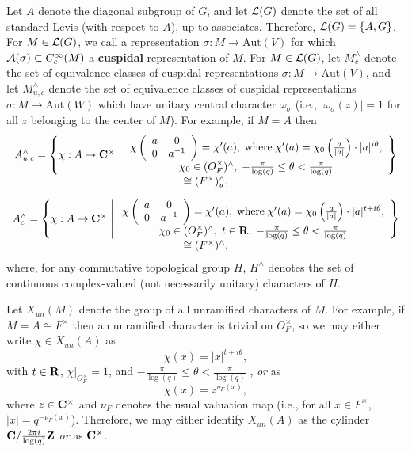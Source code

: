 \documentclass[11pt, a4paper]{article}
\begin{document}
Let $A$ denote the diagonal subgroup of $G$, and let ${\cal L}(G)$ denote
the set of all standard Levis (with respect to $A$), up to associates.
Therefore, ${\cal L}(G)=\{A,G\}$. For $M\in {\cal L}(G)$, we call a
representation $\sigma :M\rightarrow \mathrm{Aut}(V)$ for which ${\cal A}(\sigma )\subset
C_c^\infty (M)$ a {\bf cuspidal} representation of $M$. For $M\in {\cal L}%
(G)$, let $M_c^{\wedge }$ denote the set of equivalence classes of cuspidal
representations $\sigma :M\rightarrow \mathrm{Aut}(V)$, and let $M_{u,c}^{\wedge }$
denote the set of equivalence classes of cuspidal representations $\sigma
:M\rightarrow \mathrm{Aut}(W)$ which have unitary central character $\omega _\sigma $
(i.e., $|\omega _\sigma (z)|=1$ for all $z$ belonging to the center of $M$).
For example, if $M=A$ then
\[
\begin{array}{c}
A_{u,c}^{\wedge }=\left\{\chi :A\rightarrow {\bf C}^{\times }\;\middle|\; 
\begin{array}{c}
\chi \left( 
\begin{array}{cc}
a & 0 \\ 
0 & a^{-1}
\end{array}
\right)=\chi ^{\prime }(a),\;\mathrm{where}\;\chi ^{\prime }(a)=\chi _0\left(\frac a{|a|}\right)\cdot
|a|^{i\theta }, \\ 
\chi _0\in (O_F^{\times })^{\wedge },\;-\frac \pi {\log (q)}\leq \theta
<\frac \pi {\log (q)}
\end{array}\right\}
\\ 
\cong (F^{\times })_u^{\wedge }, \\[10pt]
A_c^{\wedge }=\left\{\chi :A\rightarrow {\bf C}^{\times }\;\middle|\; 
\begin{array}{c}
\chi \left( 
\begin{array}{cc}
a & 0 \\ 
0 & a^{-1}
\end{array}
\right)=\chi ^{\prime }(a),\;\mathrm{where}\;\chi ^{\prime }(a)=\chi _0\left(\frac a{|a|}\right)\cdot
|a|^{t+i\theta }, \\ 
\chi _0\in (O_F^{\times })^{\wedge },\;t\in {\bf R},\;-\frac \pi {\log
(q)}\leq \theta <\frac \pi {\log (q)}
\end{array}\right\}
\\ 
\cong (F^{\times })^{\wedge },
\end{array}
\]
where, for any commutative topological group $H$, $H^{\wedge }$ denotes the
set of continuous complex-valued (not necessarily unitary) characters of $H$.

Let $X_{un}(M)$ denote the group of all unramified characters of $M$. For
example, if $M=A\cong F^{\times }$ then an unramified character is trivial on $O_F^{\times }$, so we may either write $\chi \in X_{un}(A)$ as
\[
\chi (x)=|x|^{t+i\theta },
\]
with $t\in {\bf R}$, $\chi |_{O_F^{\times }}=1$, and $-\frac \pi {\log (q)}\leq \theta <\frac \pi {\log (q)}$%
, {\em or} as
\[
\chi (x)=z^{\nu _F(x)},
\]
where $z\in {\bf C}^{\times }$ and $\nu _F$ denotes the usual valuation map
(i.e., for all $x\in F^{\times }$, $|x|=q^{-\nu _F(x)}$). Therefore, we may
either identify $X_{un}(A)$ as the cylinder ${\bf C}/{%
\frac{2\pi i}{\log (q)}{\bf Z}}$ {\em or} as ${\bf C}^{\times }$.
\end{document}
